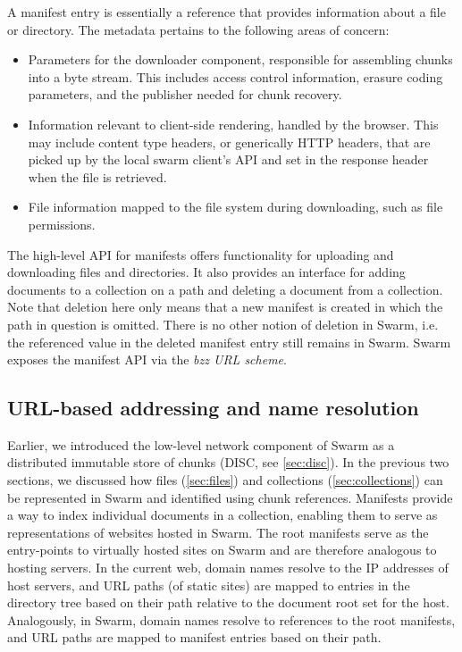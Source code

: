 A manifest entry is essentially a reference that provides information about a file or directory.
The metadata pertains to the following areas of concern: 

\begin{itemize}
  \item Parameters for the downloader component, responsible for assembling chunks into a byte stream. This includes access control information, erasure coding parameters, and the publisher needed for chunk recovery.
  
  \item Information relevant to client-side rendering, handled by the browser. This may include content type headers, or generically HTTP headers, that are picked up by the local swarm client's API and set in the response header when the file is retrieved.
  
  \item File information mapped to the file system during downloading, such as file permissions.
\end{itemize}

The high-level API for manifests offers functionality for uploading and downloading files and directories. It also provides an interface for adding documents to a collection on a path and deleting a document from a collection. Note that deletion here only means that a new manifest is created in which the path in question is omitted. There is no other notion of deletion in Swarm, i.e. the referenced value in the deleted manifest entry still remains in Swarm. Swarm exposes the manifest API via the \emph{bzz URL scheme}.

\subsection{URL-based addressing and name resolution\statusgreen}\label{sec:urls}

Earlier, we introduced the low-level network component of Swarm as a distributed immutable store of chunks (DISC, see \ref{sec:disc}). In the previous two sections, we discussed how files (\ref{sec:files}) and collections (\ref{sec:collections}) can be represented in Swarm and identified using chunk references. Manifests provide a way to index individual documents in a collection, enabling them to serve as representations of websites hosted in Swarm. The root manifests serve as the entry-points to virtually hosted sites on Swarm and are therefore analogous to hosting servers. In the current web, domain names resolve to the IP addresses of host servers, and URL paths (of static sites) are mapped to entries in the directory tree based on their path relative to the document root set for the host.
Analogously, in Swarm, domain names resolve to references to the root manifests, and URL paths are mapped to manifest entries based on their path.  

